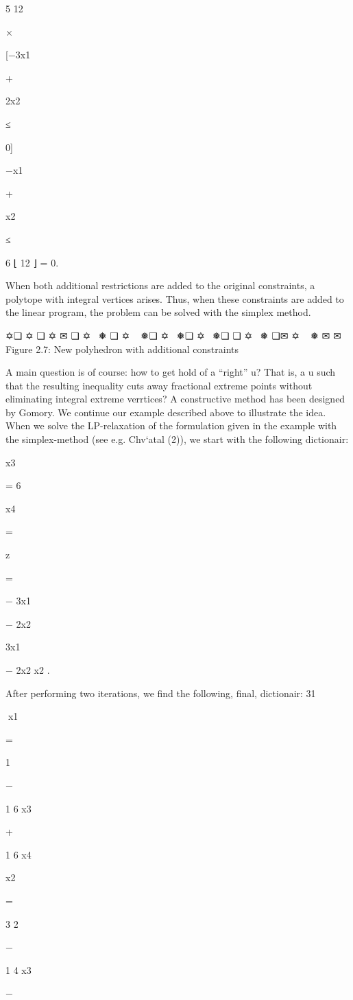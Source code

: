 \documentclass[titlepage]{book}
\theoremstyle{definition}
\begin{document}
5
12

×

[−3x1

+

2x2

≤

0]

−x1

+

x2

≤

6
⌊ 12
⌋ = 0.

When both additional restrictions are added to the original constraints, a polytope with integral vertices
arises. Thus, when these constraints are added to the linear program, the problem can be solved with
the simplex method.

✡❏
✡ ❏
✡ ✉ ❏
✡  ❅ ❏
✡  
❅❏
✡ 
❅❏
✡ 
❅❏
❏
✡ 
❅
❏✉
✡
 
❅
✉
✉
Figure 2.7: New polyhedron with additional constraints

A main question is of course: how to get hold of a “right” u? That is, a u such that the resulting inequality cuts away fractional extreme points without eliminating integral extreme verrtices? A constructive
method has been designed by Gomory. We continue our example described above to illustrate the idea.
When we solve the LP-relaxation of the formulation given in the example with the simplex-method (see
e.g. Chv`atal (2)), we start with the following dictionair:

x3

= 6

x4

=

z

=

− 3x1

− 2x2

3x1

− 2x2
x2 .

After performing two iterations, we find the following, final, dictionair:
31

x1

=

1

−

1
6 x3

+

1
6 x4

x2

=

3
2

−

1
4 x3

−
\end{document}
